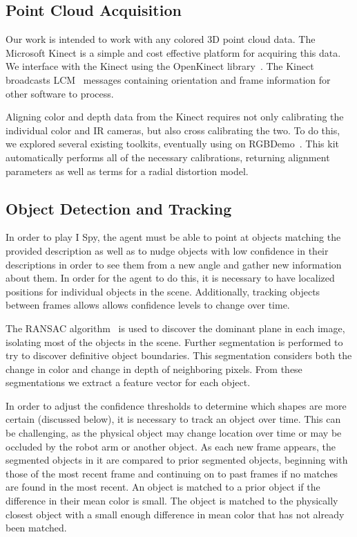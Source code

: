 \documentclass[11pt]{article}
\begin{document}
\subsection{Point Cloud Acquisition}
Our work is intended to work with any colored 3D point cloud data. The
Microsoft Kinect is a simple and cost effective platform for acquiring
this data. We interface with the Kinect using the OpenKinect
library~\cite{OpenKinect}. The Kinect broadcasts LCM~\cite{huang2010} messages
containing orientation and frame information for other software to process.

Aligning color and depth data from the Kinect requires not only
calibrating the individual color and IR cameras, but also cross calibrating
the two. To do this, we explored several existing toolkits, eventually
using on RGBDemo~\cite{rgbdemo}. This kit automatically performs all of the
necessary calibrations, returning alignment parameters as well as terms for a
radial distortion model.

\subsection{Object Detection and Tracking}
In order to play I Spy, the agent must be able to point at objects matching the
provided description as well as to nudge objects with low confidence in their
descriptions in order to see them from a new angle and gather new information
about them. In order for the agent to do this, it is necessary to have localized
positions for individual objects in the scene. Additionally, tracking objects
between frames allows allows confidence levels to change over time.

The RANSAC algorithm~\cite{fischler1981random} is used to discover the dominant
plane in each image, isolating most of the objects in the scene. Further
segmentation is performed to try to discover definitive object boundaries. This
segmentation considers both the change in color and change in depth of neighboring
pixels.
From these segmentations we extract a feature vector for each object.

In order to adjust the confidence thresholds to determine which shapes are more
certain (discussed below), it is necessary to track an object over time. This can
be challenging, as the physical object may change location over time or may be
occluded by the robot arm or another object. As each new frame appears, the
segmented objects in it are compared to prior segmented objects, beginning with
those of the most recent frame and continuing on to past frames if no matches are
found in the most recent. An object is matched to a prior object if the difference
in their mean color is small. The object is matched to the physically closest object
with a small enough difference in mean color that has not already been matched.
\end{document}
